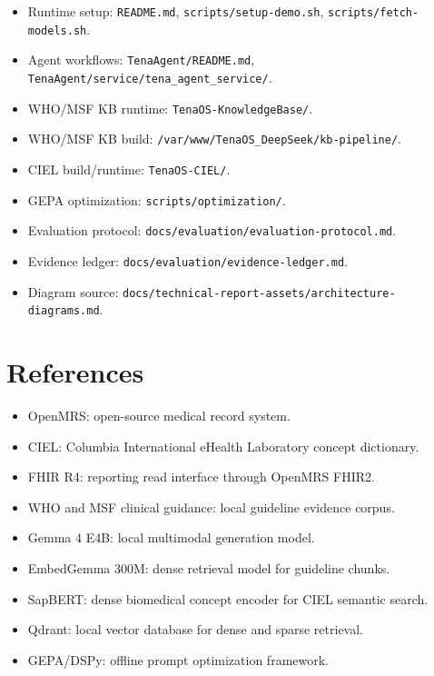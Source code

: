 \documentclass[11pt]{article}
\newcommand{\Gemma}{Gemma 4 E4B}
\newcommand{\OpenMRS}{OpenMRS}
\newcommand{\CIEL}{CIEL}
\newcommand{\WHO}{WHO/MSF}
\begin{document}
\begin{itemize}
  \item Runtime setup: \texttt{README.md}, \texttt{scripts/setup-demo.sh}, \texttt{scripts/fetch-models.sh}.
  \item Agent workflows: \texttt{TenaAgent/README.md}, \texttt{TenaAgent/service/tena\_agent\_service/}.
  \item \WHO{} KB runtime: \texttt{TenaOS-KnowledgeBase/}.
  \item \WHO{} KB build: \texttt{/var/www/TenaOS\_DeepSeek/kb-pipeline/}.
  \item \CIEL{} build/runtime: \texttt{TenaOS-CIEL/}.
  \item GEPA optimization: \texttt{scripts/optimization/}.
  \item Evaluation protocol: \texttt{docs/evaluation/evaluation-protocol.md}.
  \item Evidence ledger: \texttt{docs/evaluation/evidence-ledger.md}.
  \item Diagram source: \texttt{docs/technical-report-assets/architecture-diagrams.md}.
\end{itemize}

\section{References}

\begin{itemize}
  \item \OpenMRS{}: open-source medical record system.
  \item \CIEL{}: Columbia International eHealth Laboratory concept dictionary.
  \item FHIR R4: reporting read interface through \OpenMRS{} FHIR2.
  \item WHO and MSF clinical guidance: local guideline evidence corpus.
  \item \Gemma{}: local multimodal generation model.
  \item EmbedGemma 300M: dense retrieval model for guideline chunks.
  \item SapBERT: dense biomedical concept encoder for \CIEL{} semantic search.
  \item Qdrant: local vector database for dense and sparse retrieval.
  \item GEPA/DSPy: offline prompt optimization framework.
\end{itemize}
\end{document}
